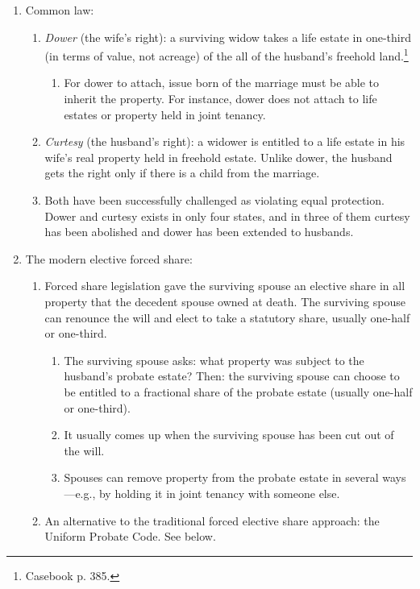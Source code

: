 \begin{enumerate}
    \item Common law:
    \begin{enumerate}
        \item \emph{Dower} (the wife's right): a surviving widow takes a life 
        estate in one-third (in terms of value, not acreage) of the all of the 
        husband's freehold land.\footnote{Casebook p. 385.}
        \begin{enumerate}
            \item For dower to attach, issue born of the marriage must be able 
            to inherit the property. For instance, dower does not attach to 
            life estates or property held in joint tenancy.
        \end{enumerate}
        \item \emph{Curtesy} (the husband's right): a widower is entitled to a 
        life estate in his wife's real property held in freehold estate. 
        Unlike dower, the husband gets the right only if there is a child from 
        the marriage.
        \item Both have been successfully challenged as violating equal 
        protection. Dower and curtesy exists in only four states, and in three 
        of them curtesy has been abolished and dower has been extended to 
        husbands.
    \end{enumerate}
    \item The modern elective forced share:
    \begin{enumerate}
        \item Forced share legislation gave the surviving spouse an elective 
        share in all property that the decedent spouse owned at death. 
        The surviving spouse can renounce the will and elect to take a 
        statutory share, usually one-half or one-third.
        \begin{enumerate}
            \item The surviving spouse asks: what property was subject to the 
            husband's probate estate? Then: the surviving spouse can choose to 
            be entitled to a fractional share of the probate estate (usually 
            one-half or one-third).
            \item It usually comes up when the surviving spouse has been cut 
            out of the will.
            \item Spouses can remove property from the probate estate in 
            several ways---e.g., by holding it in joint tenancy with someone 
            else.
        \end{enumerate}
        \item An alternative to the traditional forced elective share 
        approach: the Uniform Probate Code. See below.
    \end{enumerate}
\end{enumerate}

